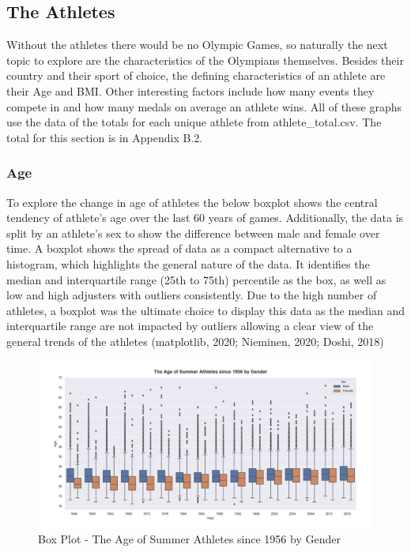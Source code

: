 \documentclass[a4 paper, 12pt]{article}
\begin{document}
    \subsection{The Athletes}
    Without the athletes there would be no Olympic Games, so naturally the next topic to explore are the characteristics of the Olympians themselves. Besides their country and their sport of choice, the defining characteristics of an athlete are their Age and BMI. Other interesting factors include how many events they compete in and how many medals on average an athlete wins. All of these graphs use the data of the totals for each unique athlete from athlete\_total.csv. The total for this section is in Appendix B.2.
    
        \subsubsection{Age}
        To explore the change in age of athletes the below boxplot shows the central tendency of athlete's age over the last 60 years of games. Additionally, the data is split by an athlete's sex to show the difference between male and female over time. A boxplot shows the spread of data as a compact alternative to a histogram, which highlights the general nature of the data. It identifies the median and interquartile range (25th to 75th) percentile as the box, as well as low and high adjusters with outliers consistently. Due to the high number of athletes, a boxplot was the ultimate choice to display this data as the median and interquartile range are not impacted by outliers allowing a clear view of the general trends of the athletes (matplotlib, 2020; Nieminen, 2020; Doshi, 2018) 
        \begin{figure} [H]
            \centering
            \includegraphics[width=\textwidth, frame]
                {./images/graph/athlete_age_boxplot.png}      
                \caption{Box Plot - The Age of Summer Athletes since 1956 by Gender} 
        \end{figure}
         
\end{document}
